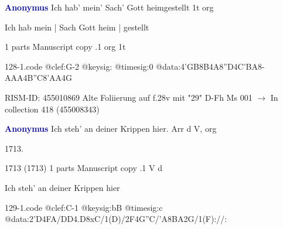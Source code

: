 \documentclass[twocolumn]{book}
\begin{document}
\newline \par \vspace{7pt} \textcolor{darkblue}{\textbf{Anonymus  }}
\newline Ich hab' mein' Sach' Gott heimgestellt  1t  
\newline org
\newline \begin{itshape}[f.28v, at left:] Ich hab mein | Sach Gott heim | gestellt\end{itshape} 
\newline \textcolor{darkblue}{}  1 parts  
\newline Manuscript copy
.1  org  1t  
\begin{filecontents*}{128-1.code}
@clef:G-2
@keysig:
@timesig:0
@data:4'GB8B4A8''D4C'BA8-{AAA}4B''C{8'AA}4G
\end{filecontents*}
\newline
%

\newline RISM-ID: 455010869
\newline Alte Foliierung auf f.28v mit "29"
\newline D-Fh  Ms 001
\newline $\rightarrow$ In collection 418 (455008343)

\newline \par \vspace{7pt} \textcolor{darkblue}{\textbf{Anonymus  }}
\newline Ich steh' an deiner Krippen hier. Arr  d  
\newline V, org
\newline \begin{itshape} 1713.\end{itshape} 
\newline \textcolor{darkblue}{}  1713 (1713)  1 parts  
\newline Manuscript copy
.1  V  d
\newline \begin{footnotesize} Ich steh' an deiner Krippen hier \end{footnotesize}  
\begin{filecontents*}{129-1.code}
@clef:C-1
@keysig:bB
@timesig:c
@data:2'D4FA/DD4.D8xC/1(D)/2F4G''C/'A{8BA}2G/1(F)://:
\end{filecontents*}
\newline
%
\end{document}

